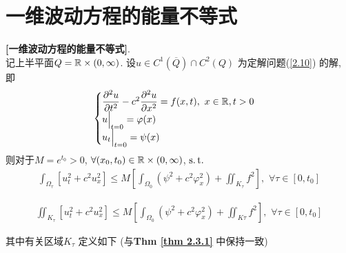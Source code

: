 \section{一维波动方程的能量不等式}
	\begin{thm}\label{thm A.4.1}
		\textbf{[一维波动方程的能量不等式]}. \\
		记上半平面$Q = \mathbb{R} \times (0 , \infty)$. 设$u \in C^1(\overline{Q}) \cap C^2(Q)$ 为定解问题(\ref{2.10}) 的解, 即
		\begin{align*}
			\begin{cases}
				\dfrac{\partial^2 u}{\partial t^2} - c^2 \dfrac{\partial^2 u}{\partial x^2} = f(x , t) , \,\, x \in \mathbb{R} , t > 0 \\
				u \Big|_{t = 0} = \varphi(x) \\
				u_t \Big|_{t = 0} = \psi(x)
			\end{cases}
		\end{align*}
		则对于$M = e^{t_0} > 0$, $\forall (x_0 , t_0) \in \mathbb{R} \times (0 , \infty)$, $\operatorname{s.t.}$
		\begin{align}
			\int_{\Omega_\tau} [ u_{t}^2 + c^2 u_{x}^2 ] 
			\leq M \left[ \int_{\Omega_0} ( \psi^2 + c^2 \varphi_{x}^2 ) + \iint_{K_\tau} f^2 \right] , \,\, \forall \tau \in [0 , t_0] 
		\end{align}
		
		\begin{align}
			\iint_{K_\tau} [u_{t}^2 + c^2 u_{x}^2] 
			\leq M \left[ \int_{\Omega_0} (\psi^2 + c^2 \varphi_{x}^2) + \iint_{K\tau} f^2 \right] , \,\, \forall \tau \in [0 , t_0]
		\end{align}
		
		\vspace*{1em}
		
		\hspace*{-1.85em}其中有关区域$K_{\tau}$ 定义如下 (与\textbf{Thm \ref{thm 2.3.1}} 中保持一致)
		

\end{thm}
